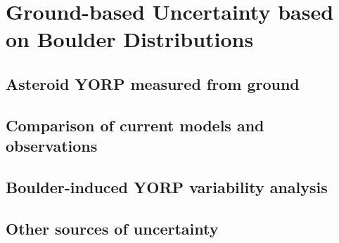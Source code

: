 \chapter{Ground-based Uncertainty based on Boulder Distributions}
\label{yorp_estimates}

\section{Asteroid YORP measured from ground}

\section{Comparison of current models and observations}

\section{Boulder-induced YORP variability analysis}

\section{Other sources of uncertainty}






